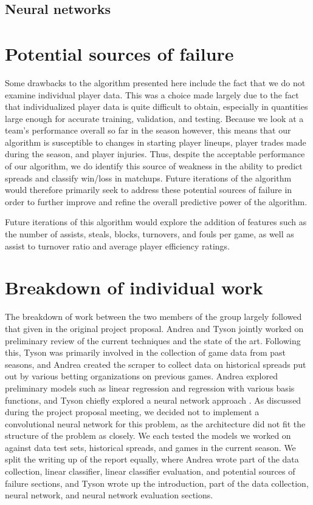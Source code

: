 \documentclass{article}
\begin{document}
\subsection{Neural networks}


\section{Potential sources of failure}
Some drawbacks to the algorithm presented here include the fact that we do not examine individual player data. This was a choice made largely due to the fact that individualized player data is quite difficult to obtain, especially in quantities large enough for accurate training, validation, and testing. Because we look at a team's performance overall so far in the season however, this means that our algorithm is susceptible to changes in starting player lineups, player trades made during the season, and player injuries. Thus, despite the acceptable performance of our algorithm, we do identify this source of weakness in the ability to predict spreads and classify win/loss in matchups. Future iterations of the algorithm would therefore primarily seek to address these potential sources of failure in order to further improve and refine the overall predictive power of the algorithm.

Future iterations of this algorithm would explore the addition of features such as the number of assists, steals, blocks, turnovers, and fouls per game, as well as assist to turnover ratio and average player efficiency ratings.


\section{Breakdown of individual work}
The breakdown of work between the two members of the group largely followed that given in the original project proposal. Andrea and Tyson jointly worked on preliminary review of the current techniques and the state of the art. Following this, Tyson was primarily involved in the collection of game data from past seasons, and Andrea created the scraper to collect data on historical spreads put out by various betting organizations on previous games. Andrea explored preliminary models such as linear regression and regression with various basis functions, and Tyson chiefly explored a neural network approach . As discussed during the project proposal meeting, we decided not to implement a convolutional neural network for this problem, as the architecture did not fit the structure of the problem as closely. We each tested the models we worked on against data test sets, historical spreads, and games in the current season. We split the writing up of the report equally, where Andrea wrote part of the data collection, linear classifier, linear classifier evaluation, and potential sources of failure sections, and Tyson wrote up the introduction, part of the data collection, neural network, and neural network evaluation sections.
\end{document}
